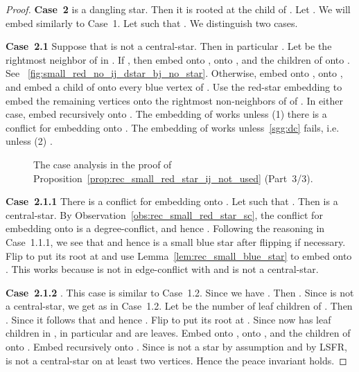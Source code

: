 \documentclass[11pt,a4paper,colorlinks=true,urlcolor=blue,citecolor=red]{article}
\theoremstyle{plain}
\newcommand{\case}[1]{\par\vspace{.5\baselineskip}\noindent\textbf{\sffamily Case~#1}}
\begin{document}
\begin{proof}
  \case{2}  is a dangling star. Then it is rooted at the child  of
  . Let . We will embed  similarly to Case~1. Let 
  such that . We distinguish two cases.

  \case{2.1} Suppose that  is not a central-star. Then in
  particular . Let  be the rightmost neighbor of 
  in . If , then embed  onto ,  onto
  , and the children of  onto . See
  \figurename~\ref{fig:small_red_no_ij_dstar_bj_no_star}. Otherwise,
  embed  onto ,  onto , and embed a child of  onto
  every blue vertex of . Use the red-star embedding
  to embed the remaining vertices onto the rightmost
   non-neighbors of  of . In either
  case, embed  recursively onto . The embedding of 
  works unless (1) there is a conflict for embedding  onto
  . The embedding of  works unless~\ref{sgg:dc} fails,
  i.e. unless (2) .

  \begin{figure}[b]
    \centering\hfil {}\hfil {}\hfil {}\hfil {}\hfil \label{fig:small_red_no_ij_2}
    \caption{The case analysis in the proof of
      Proposition~\ref{prop:rec_small_red_star_ij_not_used} (Part~3/3).}
  \end{figure}


  \case{2.1.1} There is a conflict for embedding  onto . Let
   such that . Then  is a
  central-star. By Observation~\ref{obs:rec_small_red_star_sc}, the
  conflict for embedding  onto  is a degree-conflict, and
  hence . Following the reasoning in
  Case~1.1.1, we see that  and hence  is
  a small blue star after flipping  if necessary. Flip 
  to put its root at  and use Lemma~\ref{lem:rec_small_blue_star} to
  embed  onto . This works because  is not in edge-conflict
  with  and  is not a central-star.

  \case{2.1.2} . This case is similar to
  Case~1.2. Since  we have
  . Then
  . Since
   is not a central-star, we get  as in Case~1.2. Let
   be the number of leaf children of . Then
  . Since
   it follows that 
  and hence . Flip  to put its root at .  Since
   now has  leaf children in , in particular 
  and  are leaves. Embed  onto ,  onto , and the
  children of  onto . Embed  recursively onto
  . Since  is not a star by assumption and by LSFR,
   is not a central-star on at least two vertices.
  Hence the peace invariant holds.


\end{proof}
\end{document}
